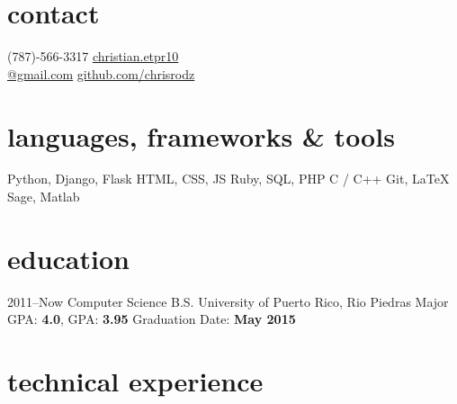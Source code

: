 \documentclass[]{friggeri-cv}
\begin{document}


\begin{aside} %
\section{contact}
(787)-566-3317
\href{mailto:christian.etpr10@gmail.com}{christian.etpr10 \\ @gmail.com}
\href{http://github.com/chrisrodz}{github.com/chrisrodz}
\section{languages, frameworks \& tools}
Python, Django, Flask
HTML, CSS, JS
Ruby, SQL, PHP
C / C++
Git, LaTeX
Sage, Matlab
\end{aside}


\section{education}

\begin{entrylist}
\entry
{2011--Now}
{Computer Science B.S.}
{University of Puerto Rico, Rio Piedras}
{Major GPA: \textbf{4.0}, GPA: \textbf{3.95} Graduation Date: \textbf{May 2015}}
\end{entrylist}


\section{technical experience}
\end{document}
